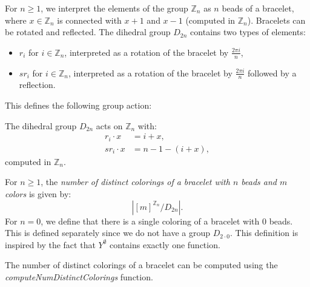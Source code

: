 For $n \geq 1$, we interpret the elements of the group $\mathbb{Z}_n$ as $n$ beads of a bracelet, where $x \in \mathbb{Z}_n$ is connected with $x + 1$ and $x - 1$ (computed in $\mathbb{Z}_n$). Bracelets can be rotated and reflected. The dihedral group $D_{2n}$ contains two types of elements:
\begin{itemize}
  \item $r_i$ for $i \in \mathbb{Z}_n$, interpreted as a rotation of the bracelet by $\frac{2\pi i}{n}$,
  \item $sr_i$ for $i \in \mathbb{Z}_n$, interpreted as a rotation of the bracelet by $\frac{2\pi i}{n}$ followed by a reflection.
\end{itemize}
This defines the following group action:

\begin{definition}
  \label{def:MulActionBracelet}
  \leanok
  The dihedral group $D_{2n}$ acts on $\mathbb{Z}_n$ with:
  \begin{align*}
    r_i \cdot x &= i + x, \\
    sr_i \cdot x &= n - 1 - (i + x),
  \end{align*}
  computed in $\mathbb{Z}_n$.
\end{definition}

\begin{definition}
  \label{def:numDistinctColoringsOfBracelet}
  \leanok
  For $n \geq 1$, the \emph{number of distinct colorings of a bracelet with $n$ beads and $m$ colors} is given by:
  \begin{equation*}
    |[m]^{\mathbb{Z}_n}/D_{2n}|.
  \end{equation*}
  For $n = 0$, we define that there is a single coloring of a bracelet with $0$ beads. This is defined separately since we do not have a group $D_{2\cdot0}$. This definition is inspired by the fact that $Y^\emptyset$ contains exactly one function.
\end{definition}

\begin{proposition}
  \label{prop:computeNumDistinctColoringsOfBracelet-eq-numDistinctColoringsOfBracelet}
  \leanok
  The number of distinct colorings of a bracelet can be computed using the \emph{computeNumDistinctColorings} function.
\end{proposition}

